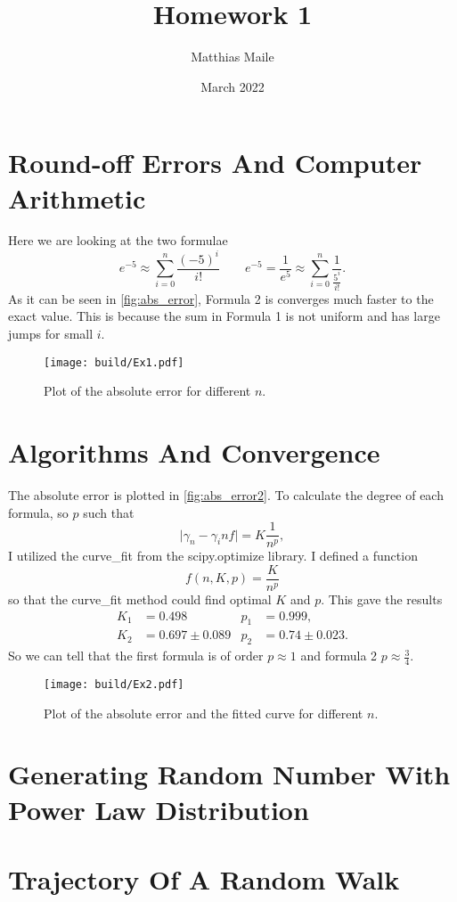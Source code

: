 \documentclass{article}
\author{Matthias Maile}
\date{March 2022}
\title{Homework 1}
\begin{document}
\maketitle
\tableofcontents

\section{Round-off Errors And Computer Arithmetic}
\label{sec:Round-off errors and Computer Arithmetic}
Here we are looking at the two formulae
\[
  e^{-5} \approx \sum_{i=0}^n \frac{(-5)^i}{i!}
  \qquad
  e^{-5} = \frac{1}{e^5} \approx \sum_{i=0}^n \frac{1}{\frac{5^i}{i!}}.
\]
As it can be seen in \autoref{fig:abs_error}, Formula 2 is converges much faster 
to the exact value. This is because the sum in Formula 1 is not uniform and has 
large jumps for small $i$.


\begin{figure}[H]
	\centering
	\texttt{[image: build/Ex1.pdf]}
	\caption{Plot of the absolute error for different $n$.}
	\label{fig:abs_error1}
\end{figure}

\section{Algorithms And Convergence}
\label{sec:Algorithms and Convergence}
The absolute error is plotted in \autoref{fig:abs_error2}. To calculate the degree of each formula, so 
$p$ such that
\[
  \vert \gamma_n - \gamma_inf \vert = K \frac{1}{n^p},
\]
I utilized the curve\_fit from the scipy.optimize library. I defined a function
\[
  f(n, K, p) = \frac{K}{n^p}
\]
so that the curve\_fit method could find optimal $K$ and $p$. This gave the results
\begin{align}
  K_1 &= 0.498 & p_1 &= 0.999, \\
  K_2 &= 0.697 \pm 0.089 & p_2 &= 0.74 \pm 0.023.
\end{align}
So we can tell that the first formula is of order $p\approx1$ and formula 2 $p\approx \frac{3}{4}$.

\begin{figure}[H]
	\centering
	\texttt{[image: build/Ex2.pdf]}
	\caption{Plot of the absolute error and the fitted curve for different $n$.}
	\label{fig:abs_error2}
\end{figure}


\section{Generating Random Number With Power Law Distribution}
\label{sec:Generating Random Number With Power Law Distribution}

\section{Trajectory Of A Random Walk}
\label{sec:Trajectory Of A Random Walk}
\end{document}
